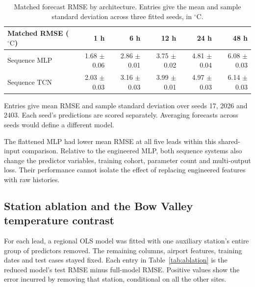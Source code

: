 \documentclass[11pt,letterpaper]{article}
\newcommand{\thead}[1]{\textbf{#1}}\newcommand{\bestscore}[1]{\textbf{#1}}
\newcommand{\celsius}{\ensuremath{^{\circ}\mathrm{C}}}\newcommand{\code}[1]{\texttt{\small #1}}
\begin{document}
\begin{table}[!htbp]
\centering\small
\caption{Matched forecast RMSE by architecture. Entries give the mean and sample standard deviation across three fitted seeds, in \celsius.}\label{tab:sequence}
\renewcommand{\arraystretch}{1.12}\begin{tabular*}{.97\linewidth}{@{\extracolsep{\fill}}lrrrrr@{}}\toprule\thead{Matched RMSE (\celsius)} & \thead{1 h} & \thead{6 h} & \thead{12 h} & \thead{24 h} & \thead{48 h}\\\midrule
Sequence MLP & 1.68 $\pm$ 0.06 & 2.86 $\pm$ 0.01 & 3.75 $\pm$ 0.02 & 4.81 $\pm$ 0.04 & 6.08 $\pm$ 0.03 \\
Sequence TCN & 2.03 $\pm$ 0.03 & 3.16 $\pm$ 0.03 & 3.99 $\pm$ 0.01 & 4.97 $\pm$ 0.03 & 6.14 $\pm$ 0.03 \\
\bottomrule\end{tabular*}
\end{table}



Entries give mean RMSE and sample standard deviation over seeds 17, 2026 and 2403. Each seed's predictions are scored separately. Averaging forecasts across seeds would define a different model.

The flattened MLP had lower mean RMSE at all five leads within this shared-input comparison. Relative to the engineered MLP, both sequence systems also change the predictor variables, training cohort, parameter count and multi-output loss. Their performance cannot isolate the effect of replacing engineered features with raw histories.


\subsection{Station ablation and the Bow Valley temperature contrast}\label{ablation}
For each lead, a regional OLS model was fitted with one auxiliary station's entire group of predictors removed. The remaining columns, airport features, training dates and test cases stayed fixed. Each entry in Table~\ref{tab:ablation} is the reduced model's test RMSE minus full-model RMSE. Positive values show the error incurred by removing that station, conditional on all the other sites.
\end{document}
